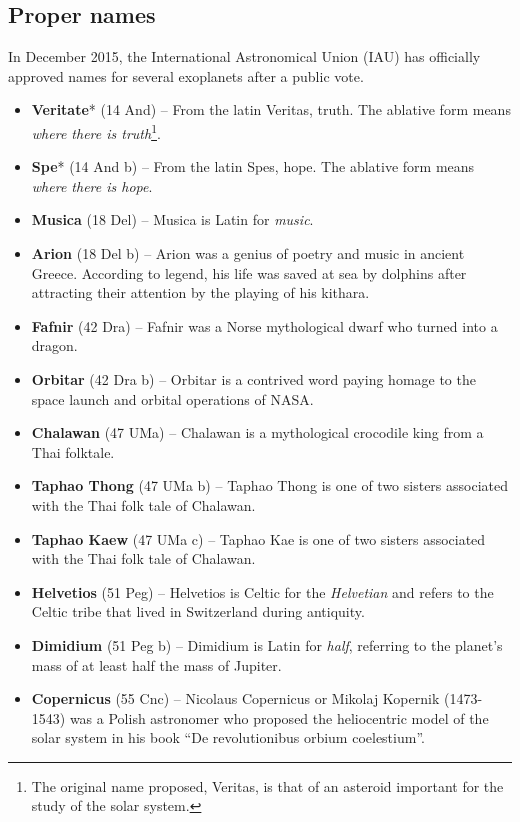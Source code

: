 \subsection{Proper names}
\label{sec:plugins:Exoplanets:ProperNames}
In December 2015, the International Astronomical Union (IAU) has officially approved names for several exoplanets after a public vote.
\begin{itemize}
\item \textbf{Veritate}* (14 And) -- From the latin Veritas, truth. The ablative form means \textit{where there is truth}\footnote{The original name proposed, Veritas, is that of an asteroid important for the study of the solar system.}.
\item \textbf{Spe}* (14 And b) -- From the latin Spes, hope. The ablative form means \textit{where there is hope}.
\item \textbf{Musica} (18 Del) -- Musica is Latin for \textit{music}.
\item \textbf{Arion} (18 Del b) -- Arion was a genius of poetry and music in ancient Greece. According to legend, his life was saved at sea by dolphins after attracting their attention by the playing of his kithara.
\item \textbf{Fafnir} (42 Dra) -- Fafnir was a Norse mythological dwarf who turned into a dragon.
\item \textbf{Orbitar} (42 Dra b) -- Orbitar is a contrived word paying homage to the space launch and orbital operations of NASA.
\item \textbf{Chalawan} (47 UMa) -- Chalawan is a mythological crocodile king from a Thai folktale.
\item \textbf{Taphao Thong} (47 UMa b) -- Taphao Thong is one of two sisters associated with the Thai folk tale of Chalawan.
\item \textbf{Taphao Kaew} (47 UMa c) -- Taphao Kae is one of two sisters associated with the Thai folk tale of Chalawan.
\item \textbf{Helvetios} (51 Peg) -- Helvetios is Celtic for the \textit{Helvetian} and refers to the Celtic tribe that lived in Switzerland during antiquity.
\item \textbf{Dimidium} (51 Peg b) -- Dimidium is Latin for \textit{half}, referring to the planet's mass of at least half the mass of Jupiter.
\item \textbf{Copernicus} (55 Cnc) -- Nicolaus Copernicus or Mikolaj Kopernik (1473-1543) was a Polish astronomer who proposed the heliocentric model of the solar system in his book ``De revolutionibus orbium coelestium''.

\end{itemize}
